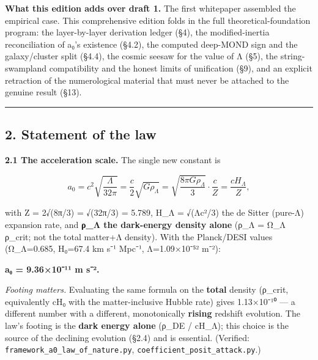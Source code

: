 \documentclass[
]{article}
\begin{document}
\textbf{What this edition adds over draft 1.} The first whitepaper
assembled the empirical case. This comprehensive edition folds in the
full theoretical-foundation program: the layer-by-layer derivation
ledger (§4), the modified-inertia reconciliation of a₀'s existence
(§4.2), the computed deep-MOND sign and the galaxy/cluster split (§4.4),
the cosmic seesaw for the value of Λ (§5), the string-swampland
compatibility and the honest limits of unification (§9), and an explicit
retraction of the numerological material that must never be attached to
the genuine result (§13).

\begin{center}\rule{0.5\linewidth}{0.5pt}\end{center}

\subsection{2. Statement of the law}\label{statement-of-the-law}

\textbf{2.1 The acceleration scale.} The single new constant is

\[a_0 = c^2\sqrt{\frac{\Lambda}{32\pi}} = \frac{c}{2}\sqrt{G\rho_\Lambda} = \sqrt{\frac{8\pi G\rho_\Lambda}{3}}\cdot\frac{c}{Z} = \frac{cH_\Lambda}{Z},\]

with Z = 2√(8π/3) = √(32π/3) = 5.789, H\_Λ = √(Λc²/3) the de Sitter
(pure-Λ) expansion rate, and \textbf{ρ\_Λ the dark-energy density alone}
(ρ\_Λ = Ω\_Λ ρ\_crit; not the total matter+Λ density). With the
Planck/DESI values (Ω\_Λ=0.685, H₀=67.4 km s⁻¹ Mpc⁻¹, Λ=1.09×10⁻⁵² m⁻²):

\textbf{a₀ = 9.36×10⁻¹¹ m s⁻².}

\emph{Footing matters.} Evaluating the same formula on the
\textbf{total} density (ρ\_crit, equivalently cH₀ with the
matter-inclusive Hubble rate) gives 1.13×10⁻¹⁰ --- a different number
with a different, monotonically \textbf{rising} redshift evolution. The
law's footing is the \textbf{dark energy alone} (ρ\_DE / cH\_Λ); this
choice is the source of the declining evolution (§2.4) and is essential.
(Verified: \texttt{framework\_a0\_law\_of\_nature.py},
\texttt{coefficient\_posit\_attack.py}.)
\end{document}
